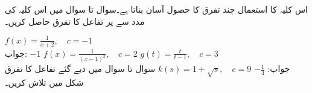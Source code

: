 اس کلیہ کا استعمال چند تفرق کا حصول آسان بناتا ہے۔سوال  تا سوال  میں اس کلیہ کی مدد سے  پر تفاعل کا تفرق حاصل کریں۔  

$f(x)=\tfrac{1}{x+2},\quad c=-1$\\
جواب:\quad
$-1$
$f(x)=\tfrac{1}{(x-1)^2},\quad c=2$
$g(t)=\tfrac{t}{t-1},\quad c=3$\\
جواب:\quad
$-\tfrac{1}{4}$
$k(s)=1+\sqrt{s},\quad c=9$
سوال  تا سوال  میں دیے گئے تفاعل کا تفرق شکل  میں تلاش کریں۔
